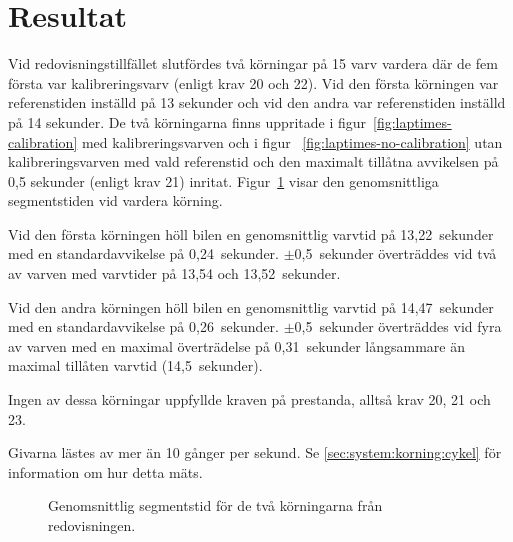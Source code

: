 \section{Resultat}

Vid redovisningstillfället slutfördes två körningar på 15 varv vardera där de
fem första var kalibreringsvarv (enligt krav 20 och 22). Vid den första
körningen var referenstiden inställd på 13 sekunder och vid den andra var
referenstiden inställd på 14 sekunder. De två körningarna finns uppritade i
figur~\ref{fig:laptimes-calibration} med kalibreringsvarven och i figur~
\ref{fig:laptimes-no-calibration} utan kalibreringsvarven med vald referenstid
och den maximalt tillåtna avvikelsen på 0,5 sekunder (enligt krav 21) inritat.
Figur~\ref{fig:segtimes} visar den genomsnittliga segmentstiden vid vardera
körning.

Vid den första körningen höll bilen en genomsnittlig varvtid på 13,22~sekunder
med en standardavvikelse på 0,24~sekunder. $\pm$0,5~sekunder överträddes vid två
av varven med varvtider på 13,54 och 13,52~sekunder.

Vid den andra körningen höll bilen en genomsnittlig varvtid på 14,47~sekunder
med en standardavvikelse på 0,26~sekunder. $\pm$0,5~sekunder överträddes vid
fyra av varven med en maximal överträdelse på 0,31~sekunder långsammare än
maximal tillåten varvtid (14,5~sekunder).

Ingen av dessa körningar uppfyllde kraven på prestanda, alltså krav 20, 21 och
23.

Givarna lästes av mer än 10 gånger per sekund. Se \ref{sec:system:korning:cykel} för information om hur
detta mäts.

\begin{figure}
	\centering
	\caption{Genomsnittlig segmentstid för de två körningarna från redovisningen.}
	\label{fig:segtimes}
\end{figure}

